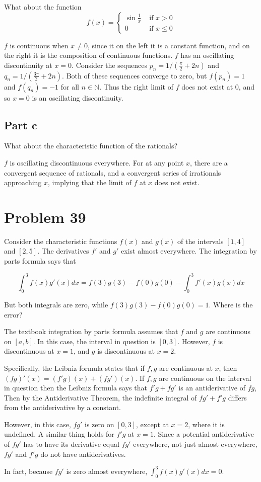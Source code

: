 \documentclass{article}
\newcommand{\N}{\mathbb{N}}
\begin{document}
What about the function
\[
f(x) = 
\begin{cases}
\sin \frac{1}{x} & \text{ if } x > 0 \\
0 & \text{ if } x \leq 0
\end{cases}
\]

$f$ is continuous when $x \neq 0$, since it on the left it is a constant function, and on the right it is the composition of continuous functions. $f$ has an oscillating discontinuity at $x=0$. Consider the sequences $p_n = 1/ (\frac{\pi}{2} + 2n)$ and $q_n = 1/ (\frac{3\pi}{2} + 2n)$. Both of these sequences converge to zero, but $f(p_n) = 1$ and $f(q_n) = -1$ for all $n \in \N$. Thus the right limit of $f$ does not exist at $0$, and so $x=0$ is an oscillating discontinuity.

\subsection*{Part c}

What about the characteristic function of the rationals?

$f$ is oscillating discontinuous everywhere. For at any point $x$, there are a convergent sequence of rationals, and a convergent series of irrationals approaching $x$, implying that the limit of $f$ at $x$ does not exist.

\section*{Problem 39}

Consider the characteristic functions $f(x)$ and $g(x)$ of the intervals $[1, 4]$ and $[2, 5]$. The derivatives $f'$ and $g'$ exist almost everywhere. The integration by parts formula says that

\[
\int_0^3 f(x)g'(x) dx = f(3)g(3) - f(0)g(0) - \int_0^3 f'(x)g(x)dx
\]

But both integrals are zero, while $f(3)g(3) - f(0)g(0) = 1$. Where is the error?

The textbook integration by parts formula assumes that $f$ and $g$ are continuous on $[a, b]$. In this case, the interval in question is $[0, 3]$. However, $f$ is discontinuous at $x=1$, and $g$ is discontinuous at $x = 2$.

Specifically, the Leibniz formula states that if $f, g$ are continuous at $x$, then $(fg)'(x) = (f'g)(x) + (fg')(x)$. If $f, g$ are continuous on the interval in question then the Leibniz formula says that $f'g + fg'$ is an antiderivative of $fg$, Then by the Antiderivative Theorem, the indefinite integral of $fg' + f'g$ differs from the antiderivative by a constant.

However, in this case, $fg'$ is zero on $[0, 3]$, except at $x=2$, where it is undefined. A similar thing holds for $f'g$ at $x=1$. Since a potential antiderivative of $fg'$ has to have its derivative equal $fg'$ everywhere, not just almost everywhere, $fg'$ and $f'g$ do not have antiderivatives.

In fact, because $fg'$ is zero almost everywhere, $\int_0^3 f(x)g'(x) dx = 0$.
\end{document}
